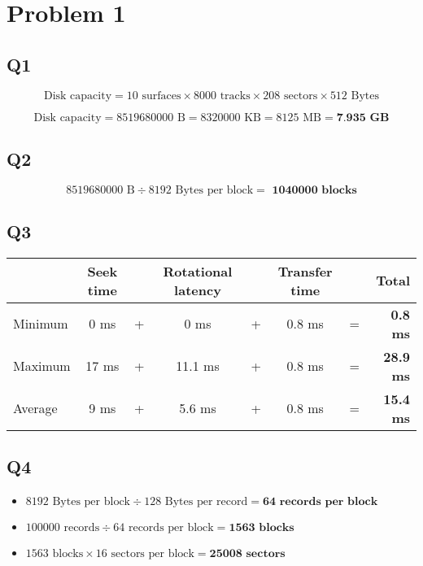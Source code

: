 \documentclass[a4paper, 12pt]{article}
\begin{document}
\section*{Problem 1}

\subsection*{Q1}

\[ \text{Disk capacity} = 10 \text{ surfaces} \times 8000 \text{ tracks} \times
		208 \text{ sectors} \times 512 \text{ Bytes}  \]

\[ \text{Disk capacity} = 8519680000 \text{ B} = 8320000 \text{ KB} = 8125
		\text{ MB} = \textbf{7.935 GB} \]

\subsection*{Q2}

\[ 8519680000 \text{ B} \div 8192 \text{ Bytes per block} = \textbf{ 1040000
				blocks} \]

\subsection*{Q3}

\begin{table}[h]
	\centering
	\begin{tabular}{l c c c c c c r}
		& Seek time & & Rotational latency & & Transfer time & &  Total \\
		
		\hline

		Minimum & 0 ms & + & 0 ms & + & 0.8 ms & = & \textbf{0.8 ms} \\

		Maximum & 17 ms & + & 11.1 ms & + & 0.8 ms & = & \textbf{28.9 ms}  \\

		Average & 9 ms & + & 5.6 ms & + & 0.8 ms & = & \textbf{15.4 ms} \\

	\end{tabular}
\end{table}

\subsection*{Q4}

\begin{itemize}
	\item $ 8192 \text{ Bytes per block} \div 128 \text{ Bytes per record} =
			\textbf{64 records per block}  $
	\item $ 100000 \text{ records} \div 64 \text{ records per block} =
			\textbf{1563 blocks} $
	\item $ 1563 \text{ blocks} \times 16 \text{ sectors per block} =
			\textbf{25008 sectors} $
\end{itemize}
\end{document}
